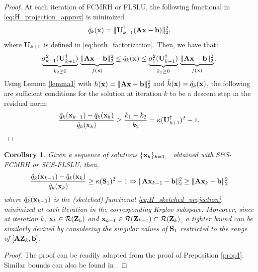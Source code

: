 \documentclass[11pt]{article}
\numberwithin{equation}{section}
\newtheorem{corollary}{Corollary}
\newcommand{\bfA}{{\bf A}}
\newcommand{\bfS}{{\bf S}}
\newcommand{\bfU}{{\bf U}}
\newcommand{\bfZ}{{\bf Z}}
\newcommand{\bfb}{{\bf b}}
\newcommand{\bfx}{{\bf x}}
\begin{document}
\begin{proof} At each iteration of FCMRH or FLSLU, the following functional in  \eqref{eq:H_projection_approx} is minimized
\begin{equation*}
   \hat q_k(\bfx) = \| \bfU_{k+1}^{\dagger} (\bfA \bfx - \bfb) \|_2^2,
\end{equation*}
where $\bfU_{k+1}$ is defined in  \eqref{eq:both_factorization}. Then, we have that:
\begin{eqnarray*}
\underbrace{\sigma_{k+1}^2(\bfU_{k+1}^{\dagger})}_{k_2 \geq 0 } \,  \underbrace{\| \bfA \bfx - \bfb \|_2^2}_{f(\bfx)} \leq   \hat q_k(\bfx) \leq  \underbrace{\sigma_1^2(\bfU_{k+1}^{\dagger})}_{k_1 \geq 0 } \, \underbrace{ \| \bfA \bfx - \bfb \|_2^2}_{f(\bfx)}.
\end{eqnarray*}
Using Lemma \ref{lemma1} with $h(\bfx)=\|\bfA\bfx-\bfb\|_2^2$ and $\hat h(\bfx) = \hat q_k(\bfx)$, the following are sufficient conditions for the solution at iteration $k$ to be a descent step in the residual norm:
\[\frac{\hat q_k(\bfx_{k-1})-\hat q_k(\bfx_{k})}{\hat q_k(\bfx_{k})} \geq \frac{k_1-k_2}{k_2}=\kappa(\bfU_{k+1}^{\dagger})^2-1.\]
\end{proof}

\begin{corollary} Given a sequence of solutions $\{\bfx_k\}_{k=1,..	}$ obtained with S\&S-FCMRH or S\&S-FLSLU, then,
\[
\frac{\hat q_k(\bfx_{k-1})-\hat q_k(\bfx_{k})}{\hat q_k(\bfx_{k})} \geq \kappa(\bfS_1)^2-1 \Rightarrow \|\bfA \bfx_{k-1} - \bfb\|_2^2 \geq \|\bfA \bfx_k - \bfb\|_2^2 
\]
where $\hat q_k(\bfx_{k-1})$ is the (sketched) functional \eqref{eq:H_sketched_projection}, minimized at each iteration in the corresponding Krylov subspace. Moreover, since at iteration $k$, $\bfx_{k} \in \mathcal{R}(\bfZ_k)$ and $\bfx_{k-1} \in \mathcal{R}(\bfZ_{k-1})\subset \mathcal{R}(\bfZ_k)$, a tighter bound can be similarly derived by considering the singular values of $\bfS_1$ restricted to the range of $[\bfA \bfZ_k,\bfb]$. 
\end{corollary}
\begin{proof}
The proof can be readily adapted from the proof of Preposition \ref{prop1}. Similar bounds can also be found in \cite{Sabate2025rand}.
\end{proof}
\end{document}
